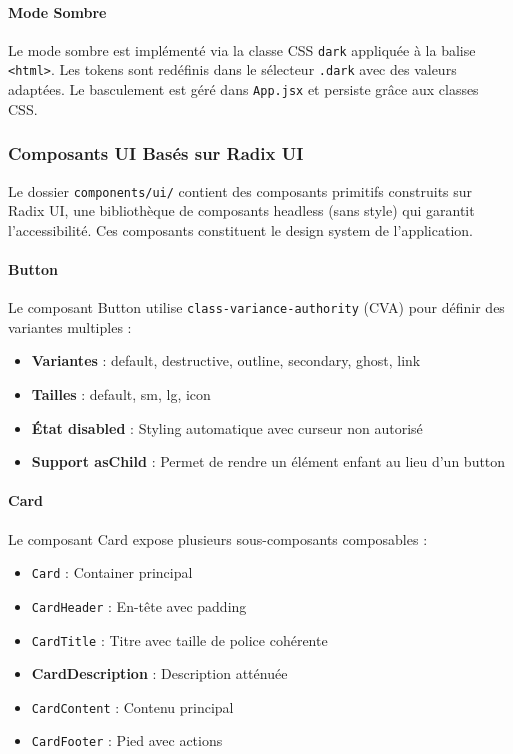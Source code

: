 \paragraph{Mode Sombre}

Le mode sombre est implémenté via la classe CSS \texttt{dark} appliquée à la balise \texttt{<html>}. Les tokens sont redéfinis dans le sélecteur \texttt{.dark} avec des valeurs adaptées. Le basculement est géré dans \texttt{App.jsx} et persiste grâce aux classes CSS.

\subsubsection{Composants UI Basés sur Radix UI}

Le dossier \texttt{components/ui/} contient des composants primitifs construits sur Radix UI, une bibliothèque de composants headless (sans style) qui garantit l'accessibilité. Ces composants constituent le design system de l'application.

\paragraph{Button}

Le composant Button utilise \texttt{class-variance-authority} (CVA) pour définir des variantes multiples :

\begin{itemize}
    \item \textbf{Variantes} : default, destructive, outline, secondary, ghost, link
    \item \textbf{Tailles} : default, sm, lg, icon
    \item \textbf{État disabled} : Styling automatique avec curseur non autorisé
    \item \textbf{Support asChild} : Permet de rendre un élément enfant au lieu d'un button
\end{itemize}

\paragraph{Card}

Le composant Card expose plusieurs sous-composants composables :

\begin{itemize}
    \item \texttt{Card} : Container principal
    \item \texttt{CardHeader} : En-tête avec padding
    \item \texttt{CardTitle} : Titre avec taille de police cohérente
    \item \textbf{CardDescription} : Description atténuée
    \item \texttt{CardContent} : Contenu principal
    \item \texttt{CardFooter} : Pied avec actions
\end{itemize}

